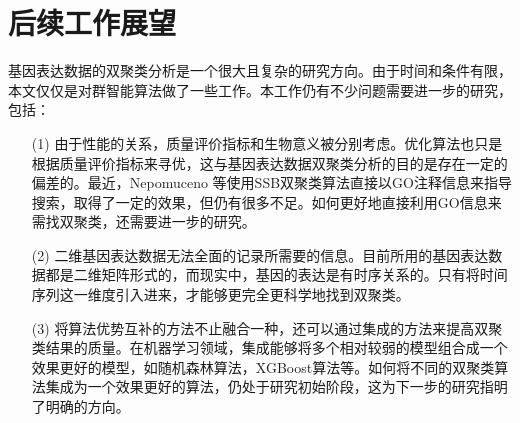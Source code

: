 \section{后续工作展望}
基因表达数据的双聚类分析是一个很大且复杂的研究方向。由于时间和条件有限，本文仅仅是对群智能算法做了一些工作。本工作仍有不少问题需要进一步的研究，包括：
\begin{itemize}
    \item [(1)]{由于性能的关系，质量评价指标和生物意义被分别考虑。优化算法也只是根据质量评价指标来寻优，这与基因表达数据双聚类分析的目的是存在一定的偏差的。最近，Nepomuceno 等使用SSB双聚类算法直接以GO注释信息来指导搜索，取得了一定的效果，但仍有很多不足。如何更好地直接利用GO信息来需找双聚类，还需要进一步的研究。}

    \item [(2)]{二维基因表达数据无法全面的记录所需要的信息。目前所用的基因表达数据都是二维矩阵形式的，而现实中，基因的表达是有时序关系的。只有将时间序列这一维度引入进来，才能够更完全更科学地找到双聚类。}

    \item [(3)]{将算法优势互补的方法不止融合一种，还可以通过集成的方法来提高双聚类结果的质量。在机器学习领域，集成能够将多个相对较弱的模型组合成一个效果更好的模型，如随机森林算法，XGBoost算法等。如何将不同的双聚类算法集成为一个效果更好的算法，仍处于研究初始阶段，这为下一步的研究指明了明确的方向。}
    
\end{itemize}